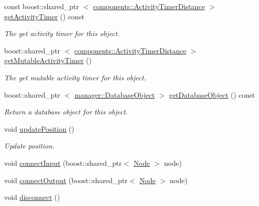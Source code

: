 \begin{DoxyCompactItemize}
const boost\-::shared\-\_\-ptr\*
$<$ \hyperlink{classcryomesh_1_1components_1_1ActivityTimerDistance}{components\-::\-Activity\-Timer\-Distance} $>$ \hyperlink{classcryomesh_1_1components_1_1Connection_a1ff605cc45ba4cdaad44e5c68a52cadc}{get\-Activity\-Timer} () const 
\begin{DoxyCompactList}\small\item\em \-The get activity timer for this object. \end{DoxyCompactList}\item 
boost\-::shared\-\_\-ptr\*
$<$ \hyperlink{classcryomesh_1_1components_1_1ActivityTimerDistance}{components\-::\-Activity\-Timer\-Distance} $>$ \hyperlink{classcryomesh_1_1components_1_1Connection_a2013cc96ac34c8b4897e81cda18fe146}{get\-Mutable\-Activity\-Timer} ()
\begin{DoxyCompactList}\small\item\em \-The get mutable activity timer for this object. \end{DoxyCompactList}\item 
boost\-::shared\-\_\-ptr\*
$<$ \hyperlink{classcryomesh_1_1manager_1_1DatabaseObject}{manager\-::\-Database\-Object} $>$ \hyperlink{classcryomesh_1_1components_1_1Connection_afb641c5447546df8b54ff7ea7ea98275}{get\-Database\-Object} () const 
\begin{DoxyCompactList}\small\item\em \-Return a database object for this object. \end{DoxyCompactList}\item 
void \hyperlink{classcryomesh_1_1components_1_1Connection_a7a12f7e30960796e481291041ca149b7}{update\-Position} ()
\begin{DoxyCompactList}\small\item\em \-Update position. \end{DoxyCompactList}\item 
void \hyperlink{classcryomesh_1_1components_1_1Connection_a29a5c50130a5a34657d67cfb317131e0}{connect\-Input} (boost\-::shared\-\_\-ptr$<$ \hyperlink{classcryomesh_1_1components_1_1Node}{\-Node} $>$ node)
\item 
void \hyperlink{classcryomesh_1_1components_1_1Connection_a87b1e2db44b157697b026a92dfa950de}{connect\-Output} (boost\-::shared\-\_\-ptr$<$ \hyperlink{classcryomesh_1_1components_1_1Node}{\-Node} $>$ node)
\item 
void \hyperlink{classcryomesh_1_1components_1_1Connection_acc48aedd2b98f080dc5cec1d229a1b24}{disconnect} ()
\item 

\end{DoxyCompactItemize}
